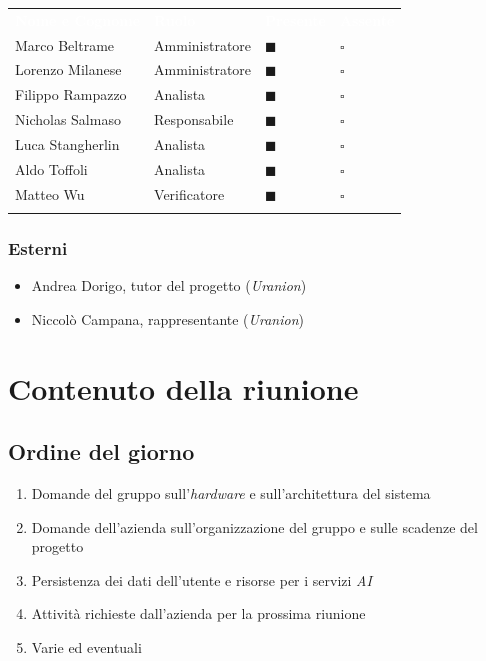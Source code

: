 \documentclass[12pt,a4paper]{article}
\newcommand{\tightlist}{\setlength{\itemsep}{1pt}\setlength{\parskip}{0pt}}
\begin{document}
\begin{center}
\begin{tabularx}{\linewidth}{>{\raggedright\arraybackslash}X>{\raggedright\arraybackslash}p{4cm}>{\centering\arraybackslash}p{2cm}>{\centering\arraybackslash}p{2cm}}
\rowcolor{bfblue}\textcolor{white}{\textbf{Nome e Cognome}} & \textcolor{white}{\textbf{Ruolo}} & \textcolor{white}{\textbf{Presente}} & \textcolor{white}{\textbf{Assente}} \\
Marco Beltrame & Amministratore & $\blacksquare$ & $\square$ \\ \arrayrulecolor{bfline}\hline
Lorenzo Milanese & Amministratore & $\blacksquare$ & $\square$ \\ \arrayrulecolor{bfline}\hline
Filippo Rampazzo & Analista & $\blacksquare$ & $\square$ \\ \arrayrulecolor{bfline}\hline
Nicholas Salmaso & Responsabile & $\blacksquare$ & $\square$ \\ \arrayrulecolor{bfline}\hline
Luca Stangherlin & Analista & $\blacksquare$ & $\square$ \\ \arrayrulecolor{bfline}\hline
Aldo Toffoli & Analista & $\blacksquare$ & $\square$ \\ \arrayrulecolor{bfline}\hline
Matteo Wu & Verificatore & $\blacksquare$ & $\square$ \\ \arrayrulecolor{bfline}\hline
\end{tabularx}
\end{center}

\subsubsection{Esterni}

\begin{itemize}
\tightlist
\item Andrea Dorigo, tutor del progetto (\emph{Uranion})
\item Niccolò Campana, rappresentante (\emph{Uranion})
\end{itemize}

\break
\section{Contenuto della riunione}

\subsection{Ordine del giorno}

\begin{enumerate}
\def\labelenumi{\arabic{enumi}.}
\tightlist
\item Domande del gruppo sull'\emph{hardware} e sull'architettura del sistema
\item Domande dell'azienda sull'organizzazione del gruppo e sulle scadenze del progetto
\item Persistenza dei dati dell'utente e risorse per i servizi \emph{AI}
\item Attività richieste dall'azienda per la prossima riunione
\item Varie ed eventuali
\end{enumerate}
\end{document}
